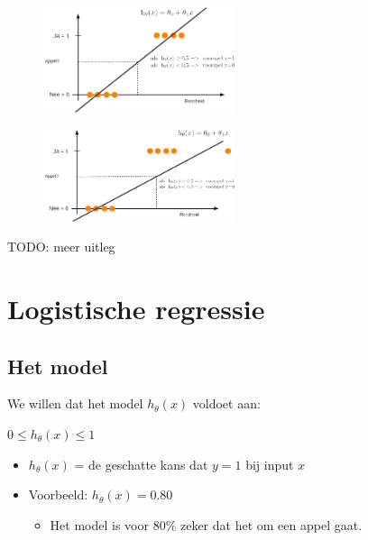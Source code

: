 \documentclass{article}
\begin{document}
\begin{figure}[H]
    \centering
    \includegraphics[width=0.5\textwidth]{classificatie-regressie2.png}
    \caption{}
\end{figure}

\begin{figure}[H]
    \centering
    \includegraphics[width=0.5\textwidth]{classificatie-regressie3.png}
    \caption{}
\end{figure}

TODO: meer uitleg

\section{Logistische regressie}

\subsection{Het model}

We willen dat het model $h_{\theta}(x)$ voldoet aan:

\begin{center}
$0 \leq h_{\theta}(x) \leq 1$
\end{center}

\begin{itemize}
    \item $h_{\theta}(x)$ = de geschatte kans dat $y=1$ bij input $x$
    \item Voorbeeld: $h_{\theta}(x) = 0.80$
    \begin{itemize}
        \item Het model is voor 80\% zeker dat het om een appel gaat.
    \end{itemize}
\end{itemize}
\end{document}
